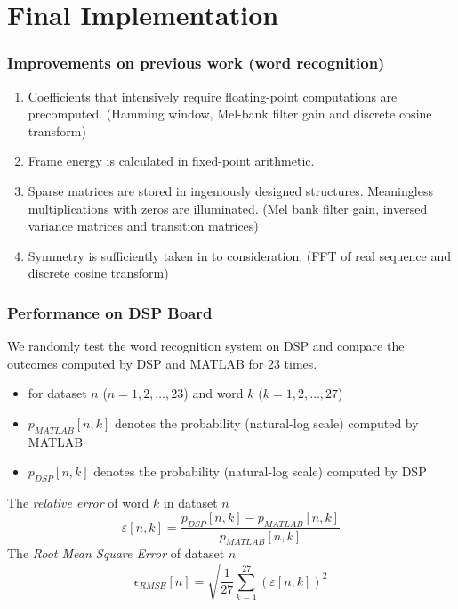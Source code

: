 \section{Final Implementation}


\begin{frame}
\frametitle{Improvements on previous work (word recognition)}
\begin{enumerate}
\item Coefficients that intensively require floating-point computations are precomputed. (Hamming window, Mel-bank filter gain and discrete cosine transform)
\item Frame energy is calculated in fixed-point arithmetic.
\item Sparse matrices are stored in ingeniously designed structures. Meaningless multiplications with zeros are illuminated. (Mel bank filter gain, inversed variance matrices and transition matrices)
\item Symmetry is sufficiently taken in to consideration. (FFT of real sequence and discrete cosine transform)
\end{enumerate}
\end{frame}


\begin{frame}
\frametitle{Performance on DSP Board}
We randomly test the word recognition system on DSP and compare the outcomes computed by DSP and MATLAB for 23 times.
\begin{itemize}
	\item for dataset $n$ ($n = 1, 2, \dots, 23$) and word $k$ ($k = 1, 2, \dots, 27$)
	\item $p_{MATLAB}[n, k]$ denotes the probability (natural-log scale) computed by MATLAB
	\item $p_{DSP}[n, k]$ denotes the probability (natural-log scale) computed by DSP
\end{itemize}

The \textit{relative error} of word $k$ in dataset $n$
\begin{equation}
\varepsilon[n, k] = \frac{p_{DSP}[n, k] - p_{MATLAB}[n, k]}{p_{MATLAB}[n, k]}
\end{equation}
The \textit{Root Mean Square Error} of dataset $n$
\begin{equation}
\epsilon_{RMSE}[n] = \sqrt{\frac{1}{27} \sum_{k = 1}^{27} (\varepsilon[n, k])^2}
\end{equation}
\end{frame}


